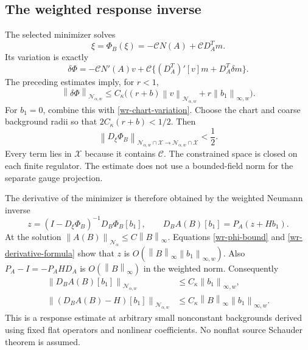 \documentclass[11pt]{article}
\theoremstyle{remark}
\newcommand{\norm}[1]{\left\|#1\right\|}
\begin{document}
\subsection{The weighted response inverse}
\label{wr-response-inverse}

The selected minimizer solves
\begin{equation}\label{wr-fixed-point}
 \xi=\Phi_B(\xi)=-\mathcal C N(A)+\mathcal C D_A^Tm.
\end{equation}
Its variation is exactly
\begin{equation}\label{wr-phi-variation}
 \delta\Phi=-\mathcal C N'(A)v
       +\mathcal C\{(D_A^T)'[v]m+D_A^T\delta m\}.
\end{equation}
The preceding estimates imply, for $r<1$,
\begin{equation}\label{wr-phi-bound}
 \norm{\delta\Phi}_{\mathcal N_{\alpha,w}}
 \le C_\kappa\bigl((r+b)\norm{v}_{\mathcal N_{\alpha,w}}
                            +r\norm{b_1}_{\infty,w}\bigr).
\end{equation}
For $b_1=0$, combine this with
\eqref{wr-chart-variation}. Choose the chart and coarse
background radii so that $2C_\kappa(r+b)<1/2$. Then
\begin{equation}\label{wr-weighted-contraction}
 \norm{D_\xi\Phi_B}_{\mathcal N_{\alpha,w}\cap\mathcal X
                         \to\mathcal N_{\alpha,w}\cap\mathcal X}
 <\frac12.
\end{equation}
Every term lies in $\mathcal X$ because it contains $\mathcal C$.
The constrained space is closed on each finite regulator. The
estimate does not use a bounded-field norm for the separate gauge
projection.

The derivative of the minimizer is therefore obtained by the
weighted Neumann inverse
\begin{equation}\label{wr-derivative-formula}
 z=(I-D_\xi\Phi_B)^{-1}D_B\Phi_B[b_1],\qquad
 D_BA(B)[b_1]=P_A(z+Hb_1).
\end{equation}
At the solution $\norm{A(B)}_{\mathcal N_\alpha}
\le C\norm{B}_\infty$. Equations \eqref{wr-phi-bound} and
\eqref{wr-derivative-formula} show that $z$ is
$O(\norm{B}_\infty\norm{b_1}_{\infty,w})$.
Also $P_A-I=-P_AHD_A$ is $O(\norm{B}_\infty)$ in the
weighted norm. Consequently
\begin{equation}\label{wr-main-response}
 \boxed{\begin{aligned}
 \norm{D_BA(B)[b_1]}_{\mathcal N_{\alpha,w}}
 &\le C_\kappa\norm{b_1}_{\infty,w},\\
 \norm{(D_BA(B)-H)[b_1]}_{\mathcal N_{\alpha,w}}
 &\le C_\kappa\norm{B}_\infty\norm{b_1}_{\infty,w}.
 \end{aligned}}
\end{equation}
This is a response estimate at arbitrary small nonconstant
backgrounds derived using fixed flat operators and nonlinear
coefficients. No nonflat source Schauder theorem is assumed.
\end{document}
